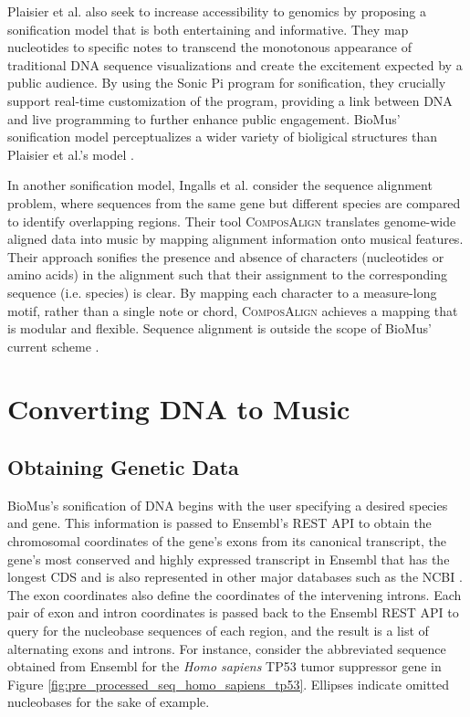 \documentclass[letterpaper]{article}
\begin{document}
Plaisier et al. also seek to increase accessibility to genomics by proposing a sonification model that is both entertaining and informative. They map nucleotides to specific notes to transcend the monotonous appearance of traditional DNA sequence visualizations and create the excitement expected by a public audience. By using the Sonic Pi program for sonification, they crucially support real-time customization of the program, providing a link between DNA and live programming to further enhance public engagement. BioMus' sonification model perceptualizes a wider variety of bioligical structures than Plaisier et al.'s model \cite{plaisier_meagher_barker_2021}.

In another sonification model, Ingalls et al. consider the sequence alignment problem, where sequences from the same gene but different species are compared to identify overlapping regions. Their tool \textsc{ComposAlign} translates genome-wide aligned data into music by mapping alignment information onto musical features. Their approach sonifies the presence and absence of characters (nucleotides or amino acids) in the alignment such that their assignment to the corresponding sequence (i.e. species) is clear. By mapping each character to a measure-long motif, rather than a single note or chord, \textsc{ComposAlign} achieves a mapping that is modular and flexible. Sequence alignment is outside the scope of BioMus' current scheme \cite{mci/Ingalls2009}. 

\section{Converting DNA to Music}
\subsection{Obtaining Genetic Data}
BioMus's sonification of DNA begins with the user specifying a desired species and gene. This information is passed to Ensembl's REST API to obtain the chromosomal coordinates of the gene's exons from its canonical transcript, the gene's most conserved and highly expressed transcript in Ensembl that has the longest CDS and is also represented in other major databases such as the NCBI \cite{ensembl_transcript_flags}. The exon coordinates also define the coordinates of the intervening introns. Each pair of exon and intron coordinates is passed back to the Ensembl REST API to query for the nucleobase sequences of each region, and the result is a list of alternating exons and introns. For instance, consider the abbreviated sequence obtained from Ensembl for the \textit{Homo sapiens} TP53 tumor suppressor gene in Figure \ref{fig:pre_processed_seq_homo_sapiens_tp53}. Ellipses indicate omitted nucleobases for the sake of example.
\end{document}
